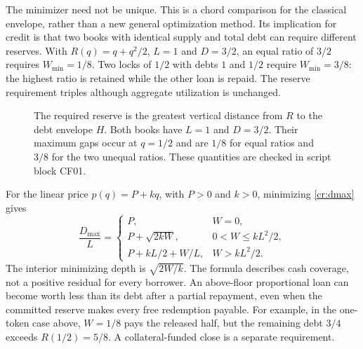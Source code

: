 The minimizer need not be unique. This is a chord comparison for the classical envelope, rather than a new general optimization method. Its implication for credit is that two books with identical supply and total debt can require different reserves. With $R(q)=q+q^2/2$, $L=1$ and $D=3/2$, an equal ratio of $3/2$ requires $W_{\min}=1/8$. Two locks of $1/2$ with debts $1$ and $1/2$ require $W_{\min}=3/8$: the highest ratio is retained while the other loan is repaid. The reserve requirement triples although aggregate utilization is unchanged.

\begin{figure}[t]
\centering
{}
\caption{The required reserve is the greatest vertical distance from $R$ to the debt envelope $H$. Both books have $L=1$ and $D=3/2$. Their maximum gaps occur at $q=1/2$ and are $1/8$ for equal ratios and $3/8$ for the two unequal ratios. These quantities are checked in script block CF01.}\label{cr:figure}
\end{figure}

For the linear price $p(q)=P+kq$, with $P>0$ and $k>0$, minimizing \eqref{cr:dmax} gives
\begin{equation}\label{cr:linearcapacity}
\frac{D_{\max}}L=
\begin{cases}
P, & W=0,\\[2pt]
P+\sqrt{2kW}, & 0<W\le kL^2/2,\\[2pt]
P+kL/2+W/L, & W>kL^2/2.
\end{cases}
\end{equation}
The interior minimizing depth is $\sqrt{2W/k}$. The formula describes cash coverage, not a positive residual for every borrower. An above-floor proportional loan can become worth less than its debt after a partial repayment, even when the committed reserve makes every free redemption payable. For example, in the one-token case above, $W=1/8$ pays the released half, but the remaining debt $3/4$ exceeds $R(1/2)=5/8$. A collateral-funded close is a separate requirement.


